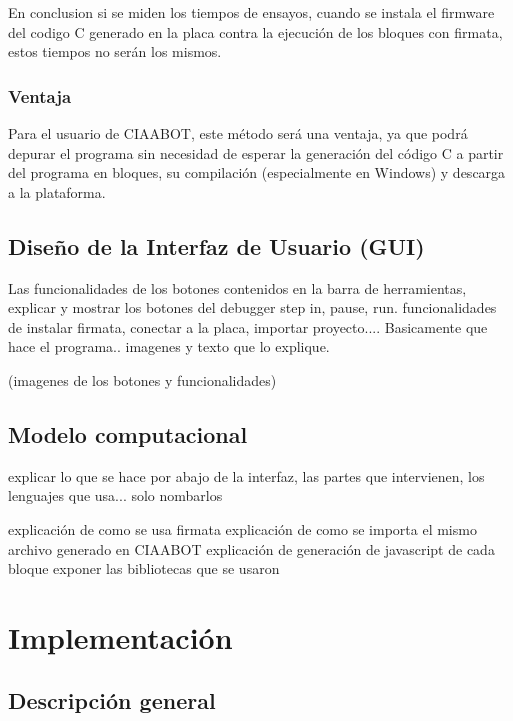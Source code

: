En conclusion si se miden los tiempos de ensayos, cuando se instala el firmware
del codigo C generado en la placa contra la ejecución de los bloques con firmata, estos tiempos no serán los mismos.

\subsubsection{Ventaja}
\label{subsec:Ventaja}

Para el usuario de CIAABOT, este método será una ventaja, ya que podrá depurar el programa sin necesidad de esperar la generación del código C a partir del programa en bloques, su compilación (especialmente en Windows) y descarga a la plataforma.


\subsection{Diseño de la Interfaz de Usuario (GUI)}
\label{subsec:Interfaz Gráfica de Usuario (GUI)}
Las funcionalidades de los botones contenidos en la barra de herramientas, explicar y mostrar los botones del debugger step in, pause, run.
funcionalidades de instalar firmata, conectar a la placa, importar proyecto....
Basicamente que hace el programa.. imagenes y texto que lo explique.

(imagenes de los botones y funcionalidades)

\subsection{Modelo computacional}
\label{subsec:Depurar un Proyecto}
explicar lo que se hace por abajo de la interfaz, las partes que intervienen, los lenguajes que usa... solo nombarlos

explicación de como se usa firmata
explicación de como se importa el mismo archivo generado en CIAABOT
explicación de generación de javascript de cada bloque
exponer las bibliotecas que se usaron



\section{Implementación}
\label{sec:Implentación}

\subsection{Descripción general}
\label{subsec:Descripción general}


